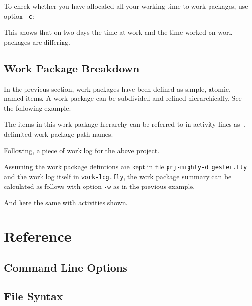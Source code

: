 \documentclass[11pt]{article}
\begin{document}
To check whether you have allocated all your working time to work packages, use option \verb:-c::



This shows that on two days the time at work and the time worked on work packages are differing.

\subsection{Work Package Breakdown}

In the previous section, work packages have been defined as simple, atomic, named items. A work package can be subdivided and refined hierarchically. See the following example.



The items in this work package hierarchy can be referred to in activity lines as \verb:.:-delimited work package path names.

Following, a piece of work log for the above project.



Assuming the work package defintions are kept in file \verb:prj-mighty-digester.fly: and the work log itself in \verb:work-log.fly:, the work package summary can be calculated as follows with option \verb:-w: as in the previous example.



And here the same with activities shown.




\section{Reference}

\subsection{Command Line Options}

\subsection{File Syntax}
\end{document}
